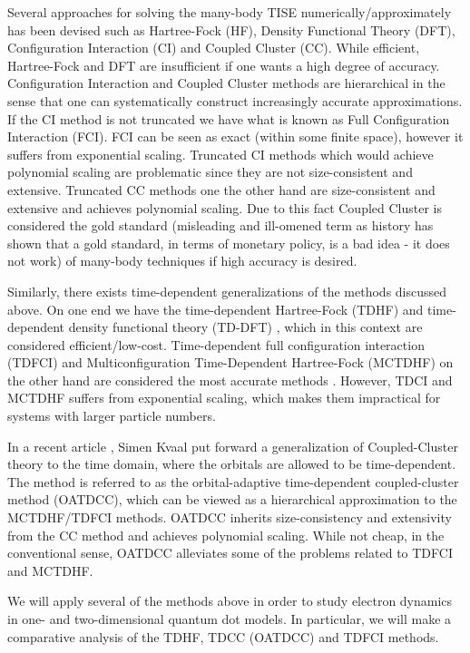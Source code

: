 \documentclass[aip,jcp,reprint,floatfix]{revtex4-1}
\begin{document}
Several approaches for solving the many-body TISE
numerically/approximately has been devised such as Hartree-Fock
(HF), Density Functional Theory (DFT), Configuration Interaction (CI)
and Coupled Cluster (CC). While efficient, Hartree-Fock and DFT are
insufficient if one wants a high degree of accuracy. Configuration
Interaction and Coupled Cluster methods are hierarchical in the sense
that one can systematically construct increasingly accurate
approximations. If the CI method is not truncated we have what is
known as Full Configuration Interaction (FCI). FCI can be seen as
exact (within some finite space), however it suffers from exponential
scaling. Truncated CI methods which would achieve polynomial scaling
are problematic since they are not size-consistent and
extensive. Truncated CC methods one the other hand are size-consistent
and extensive and achieves polynomial scaling. Due to this fact
Coupled Cluster is considered the gold standard (misleading and ill-omened term as history has shown that a gold standard, in terms of monetary policy, is a bad idea - it does not work) of many-body techniques if high accuracy is desired. 

Similarly, there exists time-dependent generalizations of the methods discussed above. On one end we have the time-dependent Hartree-Fock (TDHF) and time-dependent density functional theory (TD-DFT) \cite{TDHF_2004, TD_DFT_Ullrich_Book}, which in this context are considered efficient/low-cost. 
Time-dependent full configuration interaction (TDFCI) and Multiconfiguration Time-Dependent Hartree-Fock (MCTDHF) on the other hand are considered the most accurate methods \cite{Hochstuhl2014}. However, TDCI and MCTDHF suffers from exponential scaling, which makes them impractical for systems with larger particle numbers.

In a recent article \cite{OATDCC_2012}, Simen Kvaal put forward a generalization of Coupled-Cluster theory to the time domain, where the orbitals are allowed to be time-dependent. The method is referred to as the orbital-adaptive time-dependent coupled-cluster method (OATDCC), which can be viewed as a hierarchical approximation to the MCTDHF/TDFCI methods. OATDCC inherits size-consistency and extensivity from the CC method and achieves polynomial scaling. While not cheap, in the conventional sense, OATDCC alleviates some of the problems related to TDFCI and MCTDHF.

We will apply several of the methods above in order to study electron dynamics in one- and two-dimensional quantum dot models. In particular, we will make a comparative analysis of the TDHF, TDCC (OATDCC) and TDFCI methods. 
\end{document}
